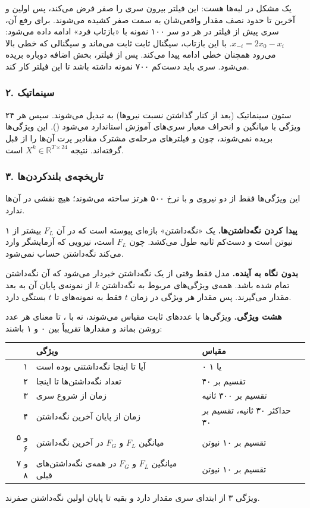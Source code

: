 یک مشکل در لبه‌ها هست: این فیلتر بیرون سری را صفر فرض می‌کند، پس اولین و آخرین  تا حدود نصف مقدار واقعی‌شان به سمت صفر کشیده می‌شوند. برای رفع آن، سری پیش از فیلتر در هر دو سر ۱۰۰ نمونه با «بازتاب فرد» ادامه داده می‌شود: $x_{-i}=2x_0-x_i$. با این بازتاب، سیگنال ثابت ثابت می‌ماند و سیگنالی که خطی بالا می‌رود همچنان خطی ادامه پیدا می‌کند. پس از فیلتر، بخش اضافه دوباره بریده می‌شود. سری باید دست‌کم ۷۰۰ نمونه داشته باشد تا این فیلتر کار کند.

\subsubsection*{۲. سینماتیک}
۲۴ ستون سینماتیک (بعد از کنار گذاشتن نسبت نیروها) به  تبدیل می‌شوند. سپس هر ویژگی با میانگین و انحراف معیار  سری‌های آموزش استاندارد می‌شود (). این ویژگی‌ها بریده نمی‌شوند، چون  و فیلترهای مرحله‌ی مشترک مقادیر پرت آن‌ها را از قبل گرفته‌اند. نتیجه $X^{k}\in\mathbb{R}^{T\times24}$ است.

\subsubsection*{۳. تاریخچه‌ی بلندکردن‌ها}
این ویژگی‌ها فقط از دو نیروی  و با نرخ ۵۰۰ هرتز ساخته می‌شوند؛  هیچ نقشی در آن‌ها ندارد.

\textbf{پیدا کردن نگه‌داشتن‌ها.} یک «نگه‌داشتن» بازه‌ای پیوسته است که در آن $F_L$ بیشتر از ۱ نیوتن است و دست‌کم  ثانیه طول می‌کشد. چون $F_L$  است، نیرویی که آزمایشگر وارد می‌کند نگه‌داشتن حساب نمی‌شود.

\textbf{بدون نگاه به آینده.} مدل فقط وقتی از یک نگه‌داشتن خبردار می‌شود که آن نگه‌داشتن تمام شده باشد. همه‌ی ویژگی‌های مربوط به نگه‌داشتن $k$ از نمونه‌ی پایان آن به بعد مقدار می‌گیرند. پس مقدار هر ویژگی در زمان $t$ فقط به نمونه‌های تا $t$ بستگی دارد.

\textbf{هشت ویژگی.} ویژگی‌ها با عددهای ثابت مقیاس می‌شوند، نه با ، تا معنای هر عدد روشن بماند و مقدارها تقریباً بین ۰ و ۱ باشند:
\begin{center}\small
\begin{tabular}{rll}
\toprule
& ویژگی & مقیاس \\
\midrule
۱ & آیا تا اینجا نگه‌داشتنی بوده است & ۰ یا ۱ \\
۲ & تعداد نگه‌داشتن‌ها تا اینجا & تقسیم بر ۴۰ \\
۳ & زمان از شروع سری & تقسیم بر ۳۰۰ ثانیه \\
۴ & زمان از پایان آخرین نگه‌داشتن & حداکثر ۳۰ ثانیه، تقسیم بر ۳۰ \\
۵ و ۶ & میانگین $F_L$ و $F_G$ در آخرین نگه‌داشتن & تقسیم بر ۱۰ نیوتن \\
۷ و ۸ & میانگین $F_L$ و $F_G$ در همه‌ی نگه‌داشتن‌های قبلی & تقسیم بر ۱۰ نیوتن \\
\bottomrule
\end{tabular}
\end{center}
ویژگی ۳ از ابتدای سری مقدار دارد و بقیه تا پایان اولین نگه‌داشتن صفرند.

